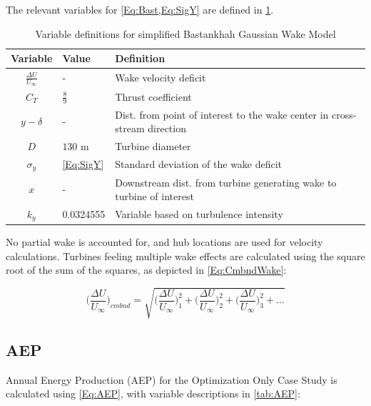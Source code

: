 \documentclass[12pt]{article}
\begin{document}
    The relevant variables for \cref{Eq:Bast,Eq:SigY} are defined in \cref{tab:WakeModel}.
    
    \begin{table}[H]
        \centering
        \begin{tabular}{|c|l|l|}
            \hline
             Variable & Value & Definition \\ \hline
            $\frac{\Delta U}{U_{\infty}}$ & - & Wake velocity deficit \\ \hline
            $C_T$ & $\frac{8}{9}$ & Thrust coefficient \\ \hline
            $y-\delta$ & - & Dist. from point of interest to the wake center in cross-stream direction \\ \hline
            $D$ & $130$ m & Turbine diameter \\ \hline
            $\sigma_y$ & \cref{Eq:SigY} & Standard deviation of the wake deficit \\ \hline
            $x$ & - & Downstream dist. from turbine generating wake to turbine of interest \\ \hline
            $k_y$ & 0.0324555 & Variable based on turbulence intensity \cite{Niayifar2016, Thomas2018} \\ \hline
        \end{tabular}
        \caption{Variable definitions for simplified Bastankhah Gaussian Wake Model}
        \label{tab:WakeModel}
    \end{table}
\vspace{-0.25cm}
    No partial wake is accounted for, and hub locations are used for velocity calculations. Turbines feeling multiple wake effects are calculated using the square root of the sum of the squares, as depicted in \cref{Eq:CmbndWake}:
    
    \begin{equation}
    \label{Eq:CmbndWake}
        \bigg(\frac{\Delta U}{U_{\infty}}\bigg)_{cmbnd} = 
            \sqrt{
                \bigg(\frac{\Delta U}{U_{\infty}}\bigg)_{1}^{2} +
                \bigg(\frac{\Delta U}{U_{\infty}}\bigg)_{2}^{2} +
                \bigg(\frac{\Delta U}{U_{\infty}}\bigg)_{3}^{2} +
                \dots}
    \end{equation}

\subsection{AEP}
    Annual Energy Production (AEP) for the Optimization Only Case Study is calculated using \cref{Eq:AEP}, with variable descriptions in \cref{tab:AEP}:
    
\end{document}
